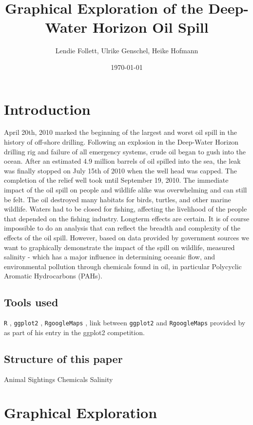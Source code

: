 \documentclass[authoryear,12pt]{elsarticle}
\title{Graphical Exploration of the Deep-Water Horizon Oil Spill}
\author{Lendie Follett, Ulrike Genschel, Heike Hofmann}
\date{\today}                                           %
\begin{document}
\maketitle
\begin{abstract}
\end{abstract}
\section{Introduction}
April 20th, 2010 marked the beginning of the largest and worst oil spill in the history of off-shore drilling.  Following an explosion in the Deep-Water Horizon drilling rig and failure of all emergency systems, crude oil began to gush into the ocean.  After an estimated 4.9 million barrels of oil spilled into the sea, the leak was finally stopped on July 15th of 2010 when the well head was capped.  The completion of the relief well took until September 19, 2010.  The immediate impact of the oil spill on people and wildlife alike was overwhelming and can still be felt.  The oil destroyed many habitats for birds, turtles, and other marine wildlife.  Waters had to be closed for fishing, affecting the livelihood of the people that depended on the fishing industry. Longterm effects are certain. It is of course impossible to do an analysis that can reflect the breadth and complexity of the effects of the oil spill.  However, based on data provided by government sources we want to graphically demonstrate the impact of the spill on wildlife, measured salinity - which has a major influence in determining oceanic flow, and environmental pollution through chemicals found in oil, in particular Polycyclic Aromatic Hydrocarbons (PAHs). 
\subsection{Tools used}

{\tt R} \citep{R2011}, {\tt ggplot2} \citep{ggplot2}, {\tt RgoogleMaps} \citep{RgoogleMaps}, link between {\tt ggplot2} and {\tt RgoogleMaps} provided by \citet{kahle2010} as part of his entry in the ggplot2 competition.

\subsection{Structure of this paper}
Animal Sightings \newline
Chemicals \newline
Salinity

\section{Graphical Exploration}
\end{document}
